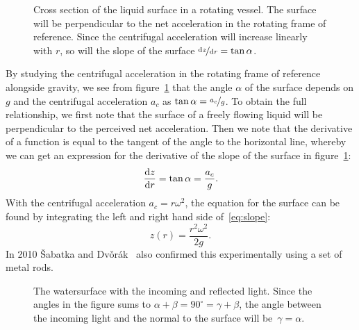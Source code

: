 \documentclass[12pt, a4paper, twocolumn]{article}
\begin{document}
\begin{figure}\centering
\resizebox{1\linewidth}{!}{}
\caption{Cross section of the liquid surface in a rotating vessel. The surface will be perpendicular to the net acceleration in the rotating frame of reference. Since the centrifugal acceleration will increase linearly with $r$, so will the slope of the surface ${\nicefrac{\dd{z}}{\dd{r}}=\tan\alpha}$. }
\label{fig:parabola} 
\end{figure}

By studying the centrifugal acceleration in the rotating frame of reference alongside gravity, we see from figure~\ref{fig:parabola} that the angle $\alpha$ of the surface depends on $g$ and the centrifugal acceleration $a_c$ as $\tan\alpha=\nicefrac{a_c}{g}$. To obtain the full relationship, we first note that the surface of a freely flowing liquid will be perpendicular to the perceived net acceleration. Then we note that the derivative of a function is equal to the tangent of the angle to the horizontal line, whereby we can get an expression for the derivative of the slope of the surface in figure~\ref{fig:parabola}:
\begin{equation}\label{eq:slope}
\dv{z}{r} = \tan\alpha = \frac{a_c}{g}.
\end{equation}
With the centrifugal acceleration $a_c=r\omega^2$, the equation for the surface can be found by integrating the left and right hand side of~\eqref{eq:slope}: 
\begin{equation}\label{eq:parabola}
z(r)=\frac{r^2\omega^2}{2g}.
\end{equation}
In 2010 \v{S}abatka and Dv\v{o}rák~\cite{Sabatka2010} also confirmed this experimentally using a set of metal rods. 


\begin{figure}\centering
\resizebox{.55\linewidth}{!}{}
\caption{
The watersurface with the incoming and reflected light. Since the angles in the figure sums to $\alpha+\beta= 90^\circ = \gamma+\beta$, the angle between the incoming light and the normal to the surface will be~$\gamma=\alpha$. }
\label{fig:angles} 
\end{figure}
\end{document}
